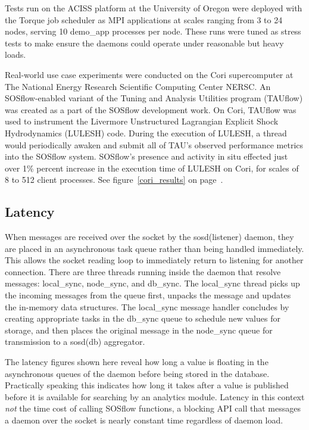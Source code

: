 Tests run on the ACISS platform at the University of Oregon were
deployed with the Torque job scheduler as MPI applications at scales
ranging from 3 to 24 nodes, serving 10 demo\_app processes per
node. These runs were tuned as stress tests to make ensure the daemons
could operate under reasonable but heavy loads.

Real-world use case experiments were conducted on the Cori
supercomputer at The National Energy Research Scientific Computing
Center NERSC. An SOSflow-enabled variant of the Tuning and Analysis
Utilities program (TAUflow) was created as a part of the SOSflow
development work. On Cori, TAUflow was used to instrument the
Livermore Unstructured Lagrangian Explicit Shock Hydrodynamics
(LULESH) code. During the execution of LULESH, a thread would
periodically awaken and submit all of TAU's observed performance
metrics into the SOSflow system. SOSflow's presence and activity in
situ effected just over 1\% percent increase in the execution time of
LULESH on Cori, for scales of 8 to 512 client processes.  See
figure~\ref{cori_results} on page~\pageref{cori_results}.


\subsection{Latency}

When messages are received over the socket by the sosd(listener)
daemon, they are placed in an asynchronous task queue rather than
being handled immediately. This allows the socket reading loop to
immediately return to listening for another connection.  There are
three threads running inside the daemon that resolve messages:
local\_sync, node\_sync, and db\_sync.  The local\_sync thread picks up
the incoming messages from the queue first, unpacks the message and
updates the in-memory data structures. The local\_sync message handler
concludes by creating appropriate tasks in the db\_sync queue to
schedule new values for storage, and then places the original message
in the node\_sync queue for transmission to a sosd(db) aggregator.

The latency figures shown here reveal how long a value is floating in
the asynchronous queues of the daemon before being stored in the
database. Practically speaking this indicates how long it takes after
a value is published before it is available for searching by an
analytics module.  Latency in this context \textit{not} the time cost
of calling SOSflow functions, a blocking API call that messages a
daemon over the socket is nearly constant time regardless of daemon
load.

